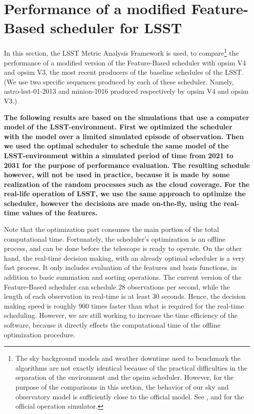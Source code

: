 \documentclass[12pt]{aastex62}
\theoremstyle{definition}
\begin{document}
\section{Performance of a modified Feature-Based scheduler for LSST}\label{sec_comp}
In this section, the LSST Metric Analysis Framework \citep{jones2014lsst} is used, to compare\footnote{The sky background models and weather downtime used to benchmark the algorithms are not exactly identical because of the practical difficulties in the separation of the environment and the opsim scheduler. However, for the purpose of the comparisons in this section, the behavior of our sky and observatory model is sufficiently close to the official model. See \citep{2016SPIE.9910E..13D}, and \citep{2016SPIE.9911E..25R} for the official operation simulator.} the performance of a modified version of the Feature-Based scheduler with opsim V4 and opsim V3, the most recent producers of the baseline schedules of the LSST. (We use two specific sequences produced by each of these scheduler. Namely, astro-lsst-01-2013 and minion-1016 produced respectively by opsim V4 and opsim V3.)

{\bf The following results are based on the simulations that use a computer model of the LSST-environment. First we optimized the scheduler with the model over a limited simulated episode of observation. Then we used the optimal scheduler to schedule the same model of the LSST-environment within a simulated period of time from 2021 to 2031 for the purpose of performance evaluation. The resulting schedule however, will not be used in practice, because it is made by some realization of the random processes such as the cloud coverage. For the real-life operation of LSST, we use the same approach to optimize the scheduler, however the decisions are made on-the-fly, using the real-time values of the features. 

Note that the optimization part consumes the main portion of the total computational time. Fortunately, the scheduler's optimization is an offline process, and can be done before the telescope is ready to operate. On the other hand, the real-time decision making, with an already optimal scheduler is a very fast process. It only includes evaluation of the features and basis functions, in addition to basic summation and sorting operations. The current version of the Feature-Based scheduler can schedule 28 observations per second, while the length of each observation in real-time is at least 30 seconds. Hence, the decision making speed is roughly 900 times faster than what is required for the real-time scheduling. However, we are still working to increase the time efficiency of the software, because it directly effects the computational time of the offline optimization procedure.\bf}
\end{document}
